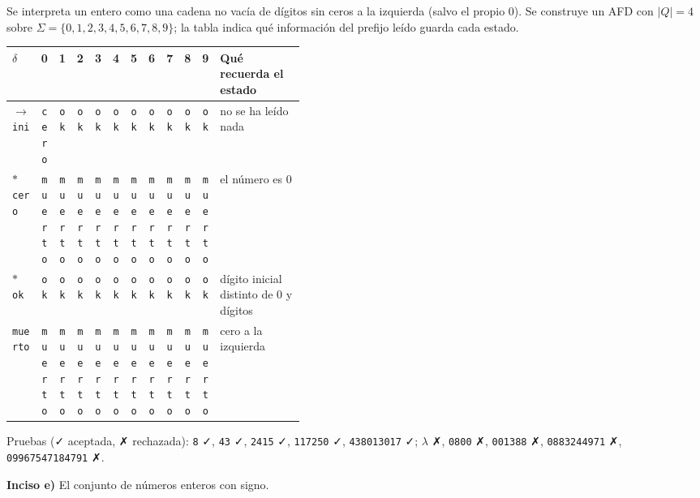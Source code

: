 \documentclass[11pt]{article}
\begin{document}
Se interpreta un entero como una cadena no vacía de dígitos sin ceros a la izquierda (salvo el propio 0). Se construye un AFD con $|Q| = 4$ sobre $\Sigma = \{0, 1, 2, 3, 4, 5, 6, 7, 8, 9\}$; la tabla indica qué información del prefijo leído guarda cada estado.
\begin{center}\small\begin{tabular}{lccccccccccp{0.42\linewidth}}\toprule
$\delta$ & 0 & 1 & 2 & 3 & 4 & 5 & 6 & 7 & 8 & 9 & Qué recuerda el estado \\\midrule
$\to$ \texttt{ini} & \texttt{cero} & \texttt{ok} & \texttt{ok} & \texttt{ok} & \texttt{ok} & \texttt{ok} & \texttt{ok} & \texttt{ok} & \texttt{ok} & \texttt{ok} & no se ha leído nada \\
$*$ \texttt{cero} & \texttt{muerto} & \texttt{muerto} & \texttt{muerto} & \texttt{muerto} & \texttt{muerto} & \texttt{muerto} & \texttt{muerto} & \texttt{muerto} & \texttt{muerto} & \texttt{muerto} & el número es 0 \\
$*$ \texttt{ok} & \texttt{ok} & \texttt{ok} & \texttt{ok} & \texttt{ok} & \texttt{ok} & \texttt{ok} & \texttt{ok} & \texttt{ok} & \texttt{ok} & \texttt{ok} & dígito inicial distinto de 0 y dígitos \\
 \texttt{muerto} & \texttt{muerto} & \texttt{muerto} & \texttt{muerto} & \texttt{muerto} & \texttt{muerto} & \texttt{muerto} & \texttt{muerto} & \texttt{muerto} & \texttt{muerto} & \texttt{muerto} & cero a la izquierda \\
\bottomrule\end{tabular}\end{center}
Pruebas (✓ aceptada, ✗ rechazada): \texttt{8} ✓, \texttt{43} ✓, \texttt{2415} ✓, \texttt{117250} ✓, \texttt{438013017} ✓; $\lambda$ ✗, \texttt{0800} ✗, \texttt{001388} ✗, \texttt{0883244971} ✗, \texttt{09967547184791} ✗.


\textbf{Inciso e)} El conjunto de números enteros con signo.
\end{document}
